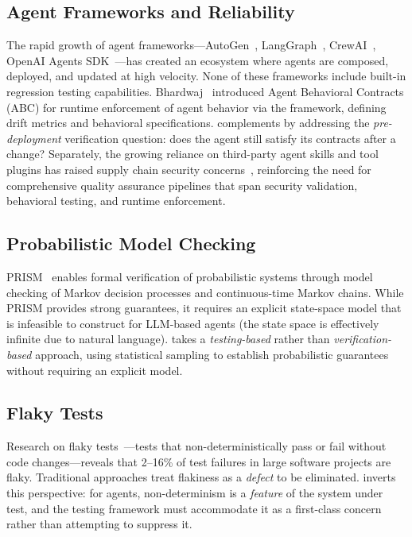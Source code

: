 \subsection{Agent Frameworks and Reliability}
\label{sec:related:frameworks}

The rapid growth of agent frameworks---AutoGen~\citep{wu2023autogen},
LangGraph~\citep{langgraph2024}, CrewAI~\citep{crewai2024}, OpenAI
Agents SDK~\citep{openai2025agents}---has created an ecosystem where
agents are composed, deployed, and updated at high velocity. None of
these frameworks include built-in regression testing capabilities.
Bhardwaj~\citep{bhardwaj2026abc} introduced Agent Behavioral Contracts
(ABC) for runtime enforcement of agent behavior via the \agentassert{}
framework, defining drift metrics and behavioral specifications.
\agentassay{} complements \agentassert{} by addressing the
\emph{pre-deployment} verification question: does the agent still satisfy
its contracts after a change? Separately, the growing reliance on
third-party agent skills and tool plugins has raised supply chain
security concerns~\citep{bhardwaj2026skillfortify}, reinforcing the
need for comprehensive quality assurance pipelines that span security
validation, behavioral testing, and runtime enforcement.

\subsection{Probabilistic Model Checking}
\label{sec:related:modelchecking}

PRISM~\citep{kwiatkowska2011prism} enables formal verification of
probabilistic systems through model checking of Markov decision processes
and continuous-time Markov chains. While PRISM provides strong
guarantees, it requires an explicit state-space model that is infeasible
to construct for LLM-based agents (the state space is effectively
infinite due to natural language). \agentassay{} takes a
\emph{testing-based} rather than \emph{verification-based} approach,
using statistical sampling to establish probabilistic guarantees without
requiring an explicit model.

\subsection{Flaky Tests}
\label{sec:related:flaky}

Research on flaky tests~\citep{luo2014empirical,parry2022survey}---tests
that non-deterministically pass or fail without code changes---reveals
that 2--16\% of test failures in large software projects are flaky.
Traditional approaches treat flakiness as a \emph{defect} to be
eliminated. \agentassay{} inverts this perspective: for agents,
non-determinism is a \emph{feature} of the system under test, and the
testing framework must accommodate it as a first-class concern rather
than attempting to suppress it.

